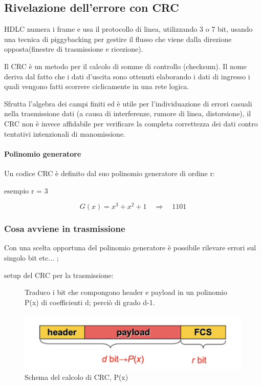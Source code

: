 \subsection{Rivelazione dell'errore con CRC}

HDLC numera i frame e usa il protocollo di linea, utilizzando 3 o 7 bit, usando una tecnica di piggybacking per gestire il flusso che viene dalla direzione opposta(finestre di trasmissione e ricezione).

Il CRC è un metodo per il calcolo di somme di controllo (checksum). Il nome deriva dal fatto che i dati d'uscita sono ottenuti elaborando i dati di ingresso i quali vengono fatti scorrere ciclicamente in una rete logica.

Sfrutta l'algebra dei campi finiti ed è utile per l'individuazione di errori casuali nella trasmissione dati (a causa di interferenze, rumore di linea, distorsione), il CRC non è invece affidabile per verificare la completa correttezza dei dati contro tentativi intenzionali di manomissione.
\paragraph{Polinomio generatore}
Un codice CRC è definito dal suo polinomio generatore di ordine r:

esempio r = 3

\begin{equation}
    G(x) = x^3 + x^2 + 1 \quad \Rightarrow \quad 1101
\end{equation}

\subsubsection{Cosa avviene in trasmissione}
 Con una scelta opportuna del polinomio generatore è possibile rilevare errori sul singolo bit etc... ;

 setup del CRC per la trasmissione:

\begin{figure}[htbp]
    \centering
    \begin{minipage}{0.45\textwidth}
        Traduco i bit che compongono header e payload in un polinomio P(x) di coefficienti d; perciò di grado d-1.
    \end{minipage}%
    \hfill
    \begin{minipage}{0.5\textwidth}
        \includegraphics[width=\linewidth]{images/crctrasmissione.png}
        \caption{Schema del calcolo di CRC, P(x)}
    \end{minipage}
\end{figure}

